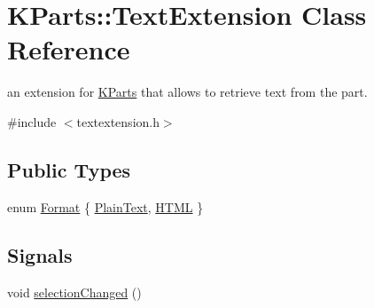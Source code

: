 \hypertarget{classKParts_1_1TextExtension}{\section{\-K\-Parts\-:\-:\-Text\-Extension \-Class \-Reference}
\label{classKParts_1_1TextExtension}
}


an extension for \hyperlink{namespaceKParts}{\-K\-Parts} that allows to retrieve text from the part.  




{\ttfamily \#include $<$textextension.\-h$>$}

\subsection*{\-Public \-Types}
\begin{DoxyCompactItemize}
\item 
enum \hyperlink{classKParts_1_1TextExtension_a65ad08598c74eae19f0c7772a251685d}{\-Format} \{ \hyperlink{classKParts_1_1TextExtension_a65ad08598c74eae19f0c7772a251685da8bb1bd219fcb9237fae7b81b6d640f96}{\-Plain\-Text}, 
\hyperlink{classKParts_1_1TextExtension_a65ad08598c74eae19f0c7772a251685da330994e99d37a75f3720547767822f37}{\-H\-T\-M\-L}
 \}
\end{DoxyCompactItemize}
\subsection*{\-Signals}
\begin{DoxyCompactItemize}
\item 
void \hyperlink{classKParts_1_1TextExtension_a4d5e1cb28d1faa2dbccef3bb41c058f9}{selection\-Changed} ()
\end{DoxyCompactItemize}
